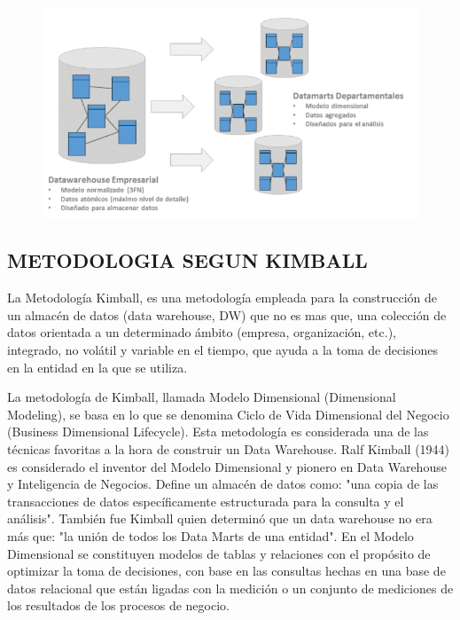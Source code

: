\documentclass[preprint,12pt]{elsarticle}
\begin{document}
			\begin{figure}[htb]
				\begin{center}
					\includegraphics[width=15cm]{./IMAGENES/imgleydi3}
				\end{center}
			\end{figure}
	

\subsection{METODOLOGIA SEGUN KIMBALL}	


La Metodología Kimball, es una metodología empleada para la construcción de un almacén de datos (data warehouse, DW) que no es mas que, una colección de datos orientada a un determinado ámbito (empresa, organización, etc.), integrado, no volátil y variable en el tiempo, que ayuda a la toma de decisiones en la entidad en la que se utiliza.

La metodología de Kimball, llamada Modelo Dimensional (Dimensional Modeling), se basa en lo que se denomina Ciclo de Vida Dimensional del Negocio (Business Dimensional Lifecycle). Esta metodología es considerada una de las técnicas favoritas a la hora de construir un Data Warehouse.
Ralf Kimball (1944) es considerado el inventor del Modelo Dimensional y pionero en Data Warehouse y Inteligencia de Negocios. Define un almacén de datos como: "una copia de las transacciones de datos específicamente estructurada para la consulta y el análisis". También fue Kimball quien determinó que un data warehouse no era más que: "la unión de todos los Data Marts de una entidad".
En el Modelo Dimensional se constituyen modelos de tablas y relaciones con el propósito de optimizar la toma de decisiones, con base en las consultas hechas en una base de datos relacional que están ligadas con la medición o un conjunto de mediciones de los resultados de los procesos de negocio.
\end{document}
